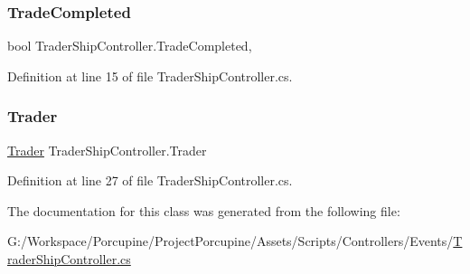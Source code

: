 \subsubsection{\texorpdfstring{Trade\+Completed}{TradeCompleted}}
{\footnotesize\ttfamily bool Trader\+Ship\+Controller.\+Trade\+Completed\hspace{0.3cm}{\ttfamily [get]}, {\ttfamily [set]}}



Definition at line 15 of file Trader\+Ship\+Controller.\+cs.

\mbox{\label{class_trader_ship_controller_a94b27220d0d4f24f818c03440e3d5ad2}} 
\subsubsection{\texorpdfstring{Trader}{Trader}}
{\footnotesize\ttfamily \hyperlink{class_trader}{Trader} Trader\+Ship\+Controller.\+Trader\hspace{0.3cm}{\ttfamily [get]}}



Definition at line 27 of file Trader\+Ship\+Controller.\+cs.



The documentation for this class was generated from the following file\+:\begin{DoxyCompactItemize}
\item 
G\+:/\+Workspace/\+Porcupine/\+Project\+Porcupine/\+Assets/\+Scripts/\+Controllers/\+Events/\hyperlink{_trader_ship_controller_8cs}{Trader\+Ship\+Controller.\+cs}\end{DoxyCompactItemize}
